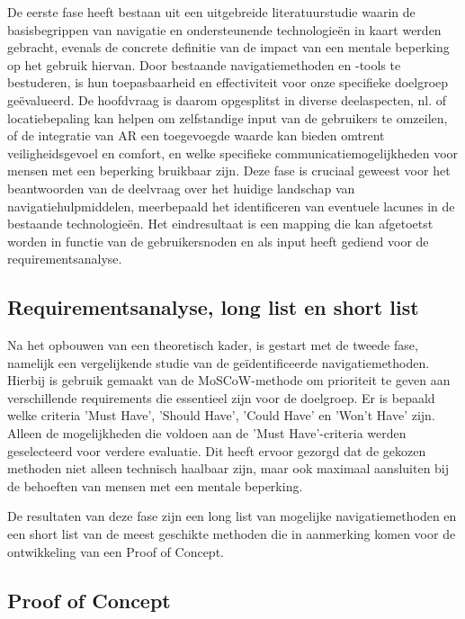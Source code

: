 De eerste fase heeft bestaan uit een uitgebreide literatuurstudie waarin de basisbegrippen van navigatie en ondersteunende technologieën in kaart werden gebracht, evenals de concrete definitie van de impact van een mentale beperking op het gebruik hiervan. Door bestaande navigatiemethoden en -tools te bestuderen, is hun toepasbaarheid en effectiviteit voor onze specifieke doelgroep geëvalueerd. De hoofdvraag is daarom opgesplitst in diverse deelaspecten, nl. of locatiebepaling kan helpen om zelfstandige input van de gebruikers te omzeilen, of de integratie van AR een toegevoegde waarde kan bieden omtrent veiligheidsgevoel en comfort, en welke specifieke communicatiemogelijkheden voor mensen met een beperking bruikbaar zijn. Deze fase is cruciaal geweest voor het beantwoorden van de deelvraag over het huidige landschap van navigatiehulpmiddelen, meerbepaald het identificeren van eventuele lacunes in de bestaande technologieën. Het eindresultaat is een mapping die kan afgetoetst worden in functie van de gebruikersnoden en als input heeft gediend voor de requirementsanalyse.

\subsection*{Requirementsanalyse, long list en short list}

Na het opbouwen van een theoretisch kader, is gestart met de tweede fase, namelijk een vergelijkende studie van de geïdentificeerde navigatiemethoden. Hierbij is gebruik gemaakt van de MoSCoW-methode om prioriteit te geven aan verschillende requirements die essentieel zijn voor de doelgroep. Er is bepaald welke criteria 'Must Have', 'Should Have', 'Could Have' en 'Won't Have' zijn. Alleen de mogelijkheden die voldoen aan de 'Must Have'-criteria werden geselecteerd voor verdere evaluatie. Dit heeft ervoor gezorgd dat de gekozen methoden niet alleen technisch haalbaar zijn, maar ook maximaal aansluiten bij de behoeften van mensen met een mentale beperking.

De resultaten van deze fase zijn een long list van mogelijke navigatiemethoden en een short list van de meest geschikte methoden die in aanmerking komen voor de ontwikkeling van een Proof of Concept.

\subsection*{Proof of Concept}

